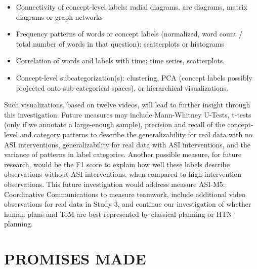 \documentclass[10pt]{article}
\begin{document}
\begin{itemize}

    \item Connectivity of concept-level labels: radial diagrams, arc diagrams,
        matrix diagrams or graph networks

    \item Frequency patterns of words or concept labels (normalized, word count
        / total number of words in that question): scatterplots or histograms

    \item Correlation of words and labels with time: time series, scatterplots. 

    \item Concept-level subcategorization(s): clustering, PCA (concept labels
        possibly projected onto sub-categorical spaces), or hierarchical
        visualizations.

\end{itemize}




Such visualizations, based on twelve videos, will lead to further insight
through this investigation. Future measures may include Mann-Whitney U-Tests,
t-tests (only if we annotate a large-enough sample), precision and recall of
the concept-level and category patterns to describe the generalizability for
real data with no ASI interventions, generalizability for real data with ASI
interventions, and the variance of patterns in label categories. Another
possible measure, for future research, would be the F1 score to explain how
well these labels describe observations without ASI interventions, when
compared to high-intervention observations. This future investigation would
address measure ASI-M5: Coordinative Communications to
measure teamwork, include additional video observations for real data in Study
3, and continue our investigation of whether human plans and ToM are best
represented by classical planning or HTN planning.

\section{PROMISES MADE}
\end{document}
